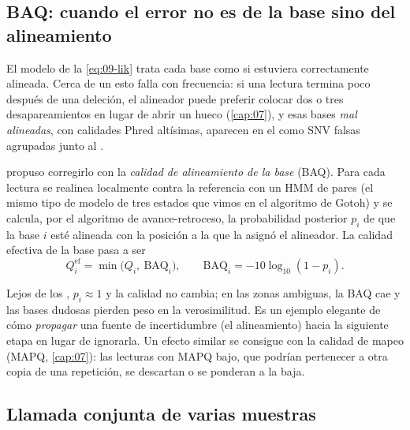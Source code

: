 \subsection{BAQ: cuando el error no es de la base sino del alineamiento}

El modelo de la \cref{eq:09-lik} trata cada base como si estuviera correctamente alineada. Cerca de un  esto falla con frecuencia: si una lectura termina poco después de una deleción, el alineador puede preferir colocar dos o tres desapareamientos en lugar de abrir un hueco (\cref{cap:07}), y esas bases \emph{mal alineadas}, con calidades Phred altísimas, aparecen en el  como SNV falsas agrupadas junto al .

\textcite{c09-li2011baq} propuso corregirlo con la \emph{calidad de alineamiento de la base} (BAQ). Para cada lectura se realinea localmente contra la referencia con un HMM de pares (el mismo tipo de modelo de tres estados que vimos en el algoritmo de Gotoh) y se calcula, por el algoritmo de avance-retroceso, la probabilidad posterior $p_i$ de que la base $i$ esté alineada con la posición a la que la asignó el alineador. La calidad efectiva de la base pasa a ser
\begin{equation}\label{eq:09-baq}
Q_i^{\text{ef}} = \min\bigl(Q_i,\ \mathrm{BAQ}_i\bigr),\qquad \mathrm{BAQ}_i = -10\log_{10}(1-p_i).
\end{equation}

\begin{simbolos}
\end{simbolos}

Lejos de los , $p_i\approx1$ y la calidad no cambia; en las zonas ambiguas, la BAQ cae y las bases dudosas pierden peso en la verosimilitud. Es un ejemplo elegante de cómo \emph{propagar} una fuente de incertidumbre (el alineamiento) hacia la siguiente etapa en lugar de ignorarla. Un efecto similar se consigue con la calidad de mapeo (MAPQ, \cref{cap:07}): las lecturas con MAPQ bajo, que podrían pertenecer a otra copia de una repetición, se descartan o se ponderan a la baja.

\subsection{Llamada conjunta de varias muestras}

